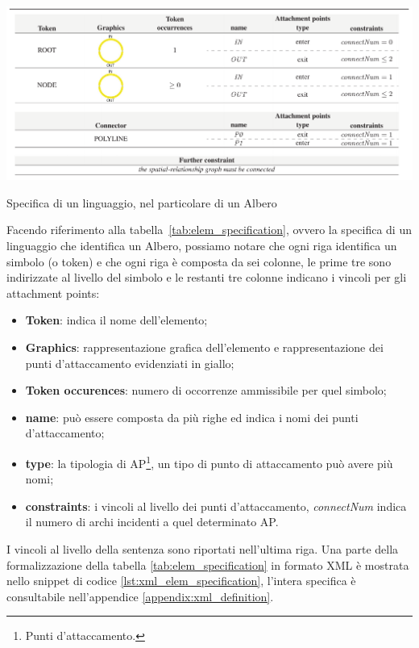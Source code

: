         \begin{table}[htbp]
            \centering
            \includegraphics[scale=0.35]{Figure/elem_specification.PNG}
            \caption{Specifica di un linguaggio, nel particolare di un Albero}
            \label{tab:elem_specification}
        \end{table}
        \noindent
        Facendo riferimento alla tabella~\ref{tab:elem_specification}, ovvero la specifica di un linguaggio che identifica un Albero, possiamo notare che ogni riga identifica un simbolo (o token) e che ogni riga è composta da sei colonne, le prime tre sono indirizzate al livello del simbolo e le restanti tre colonne indicano i vincoli per gli attachment points:
        \begin{itemize}
            \item \textbf{Token}: indica il nome dell'elemento;
            \item \textbf{Graphics}: rappresentazione grafica dell'elemento e rappresentazione dei punti d'attaccamento evidenziati in giallo;
            \item \textbf{Token occurences}: numero di occorrenze ammissibile per quel simbolo;
            \item \textbf{name}: può essere composta da più righe ed indica i nomi dei punti d'attaccamento;
            \item \textbf{type}: la tipologia di AP\footnote{Punti d'attaccamento.}, un tipo di punto di attaccamento può avere più nomi;
            \item \textbf{constraints}: i vincoli al livello dei punti d'attaccamento, \textit{connectNum} indica il numero di archi incidenti a quel determinato AP.
        \end{itemize}
        I vincoli al livello della sentenza sono riportati nell'ultima riga. Una parte della formalizzazione della tabella \ref{tab:elem_specification} in formato XML è mostrata nello snippet di codice \ref{lst:xml_elem_specification}, l'intera specifica è consultabile nell'appendice \ref{appendix:xml_definition}.

